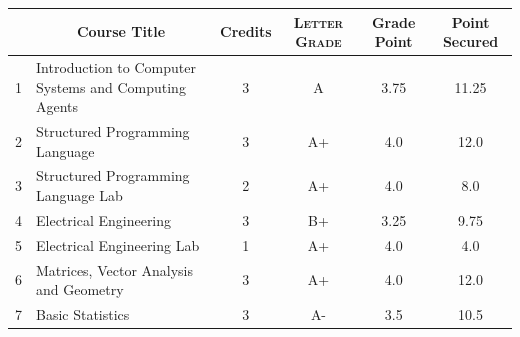 \documentclass[11pt]{article}
\newcommand*{\numtwo}[1]{\pgfmathprintnumber[
                    fixed, precision=2, fixed zerofill=true]{#1}}
\begin{document}
                \begin{center}
                    \renewcommand{\arraystretch}{1.08}
                    
                \begin{tabular}{|c|l|c|>{\scshape}c|c|c|}
                \hline  \rule[-1ex]{0pt}{3.5ex} {\centering{\bf Course Code}} &  \multicolumn{1}{c|}{\textbf{Course Title}}  & {\bf Credits} & {\bf Letter Grade} & {\bf Grade Point} & {\bf Point Secured}  \\ 
                \hline   1 &  Introduction to Computer Systems and Computing Agents		 & 3 & A & 3.75 & 11.25 \\ %
                \hline   2 &  Structured Programming Language		 & 3 & A+ & 4.0 & 12.0 \\ %
                \hline   3 &  Structured Programming Language Lab		 & 2 & A+ & 4.0 & 8.0 \\ %
                \hline   4 &  Electrical Engineering		 & 3 & B+ & 3.25 & 9.75 \\ %
                \hline   5 &  Electrical Engineering Lab		 & 1 & A+ & 4.0 & 4.0 \\ %
                \hline   6 &  Matrices, Vector Analysis and Geometry		 & 3 & A+ & 4.0 & 12.0 \\ %
                \hline   7 &  Basic Statistics		 & 3 & A- & 3.5 & 10.5 \\ %

\hline                %
                \end{tabular}
                \end{center}
                \renewcommand{\arraystretch}{1.03}
\end{document}
